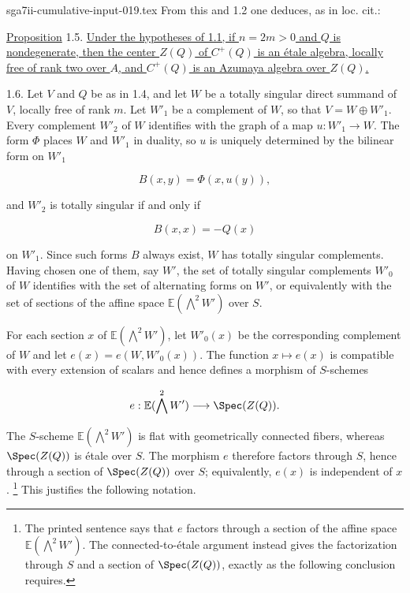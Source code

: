 \begin{filecontents*}{sga7ii-cumulative-input-019.tex}
From this and 1.2 one deduces, as in loc. cit.:

\underline{Proposition} 1.5. \underline{Under the hypotheses of 1.1, if
$n=2m>0$ and $Q$ is nondegenerate, then the center $Z(Q)$ of $C^+(Q)$ is
an étale algebra, locally free of rank two over $A$, and $C^+(Q)$ is an
Azumaya algebra over $Z(Q)$.}

1.6. Let $V$ and $Q$ be as in 1.4, and let $W$ be a totally singular
direct summand of $V$, locally free of rank $m$.  Let $W'_1$ be a
complement of $W$, so that $V=W\oplus W'_1$.  Every complement $W'_2$ of
$W$ identifies with the graph of a map $u:W'_1\to W$.  The form $\Phi$
places $W$ and $W'_1$ in duality, so $u$ is uniquely determined by the
bilinear form on $W'_1$


\begin{equation*}
B(x,y)=\Phi(x,u(y)),
\end{equation*}

and $W'_2$ is totally singular if and only if

\begin{equation*}
B(x,x)=-Q(x)
\end{equation*}

on $W'_1$.  Since such forms $B$ always exist, $W$ has totally singular
complements.  Having chosen one of them, say $W'$, the set of totally
singular complements $W'_0$ of $W$ identifies with the set of alternating
forms on $W'$, or equivalently with the set of sections of the affine
space $\mathbb E(\bigwedge^2W')$ over $S$.

For each section $x$ of $\mathbb E(\bigwedge^2W')$, let $W'_0(x)$ be the
corresponding complement of $W$ and let
$e(x)=e(W,W'_0(x))$.  The function $x\mapsto e(x)$ is compatible with
every extension of scalars and hence defines a morphism of $S$-schemes

\begin{equation*}
e:\mathbb E(\bigwedge^2W')\longrightarrow\Spec(Z(Q)).
\end{equation*}

The $S$-scheme $\mathbb E(\bigwedge^2W')$ is flat with geometrically
connected fibers, whereas $\Spec(Z(Q))$ is étale over $S$.  The morphism
$e$ therefore factors through $S$, hence through a section of
$\Spec(Z(Q))$ over $S$; equivalently, $e(x)$ is independent of $x$.
\footnote{The printed sentence says that $e$ factors through a section of
the affine space $\mathbb E(\bigwedge^2W')$.  The connected-to-étale
argument instead gives the factorization through $S$ and a section of
$\Spec(Z(Q))$, exactly as the following conclusion requires.}
This justifies the following notation.


\end{filecontents*}
